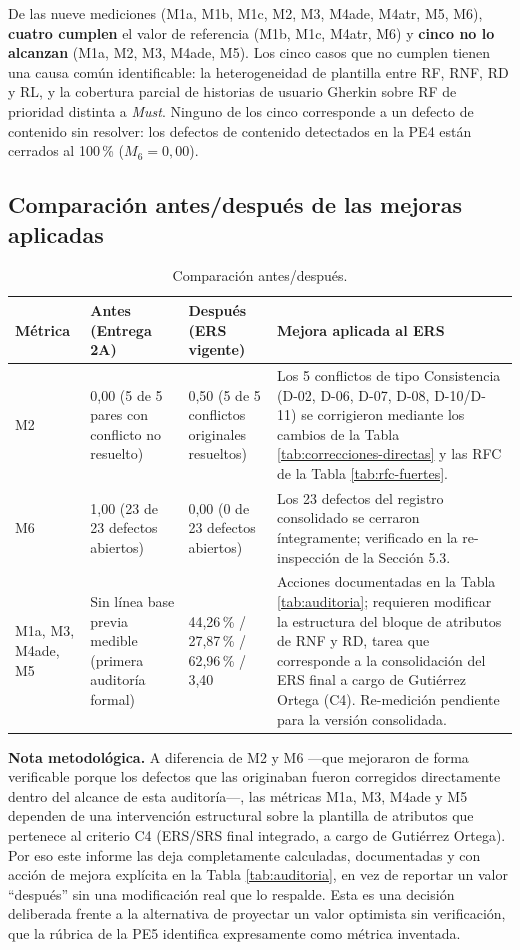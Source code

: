 \documentclass[11pt]{article}
\begin{document}
	De las nueve mediciones (M1a, M1b, M1c, M2, M3, M4ade, M4atr, M5, M6), \textbf{cuatro cumplen} el valor de referencia (M1b, M1c, M4atr, M6) y \textbf{cinco no lo alcanzan} (M1a, M2, M3, M4ade, M5). Los cinco casos que no cumplen tienen una causa común identificable: la heterogeneidad de plantilla entre RF, RNF, RD y RL, y la cobertura parcial de historias de usuario Gherkin sobre RF de prioridad distinta a \emph{Must}. Ninguno de los cinco corresponde a un defecto de contenido sin resolver: los defectos de contenido detectados en la PE4 están cerrados al 100\,\% ($M_6 = 0{,}00$).
	
	\subsection{Comparación antes/después de las mejoras aplicadas}
	
	\begin{table}[H]
		\centering
		\caption{Comparación antes/después.}
		\label{tab:antes-despues}
		\small
		\begin{tabularx}{\textwidth}{|L{2cm}|L{3.2cm}|L{3.2cm}|X|}
			\hline
			\textbf{Métrica} & \textbf{Antes (Entrega 2A)} & \textbf{Después (ERS vigente)} & \textbf{Mejora aplicada al ERS} \\
			\hline
			M2 & 0,00 (5 de 5 pares con conflicto no resuelto) & 0,50 (5 de 5 conflictos originales resueltos) & Los 5 conflictos de tipo Consistencia (D-02, D-06, D-07, D-08, D-10/D-11) se corrigieron mediante los cambios de la Tabla \ref{tab:correcciones-directas} y las RFC de la Tabla \ref{tab:rfc-fuertes}. \\
			\hline
			M6 & 1,00 (23 de 23 defectos abiertos) & 0,00 (0 de 23 defectos abiertos) & Los 23 defectos del registro consolidado se cerraron íntegramente; verificado en la re-inspección de la Sección 5.3. \\
			\hline
			M1a, M3, M4ade, M5 & Sin línea base previa medible (primera auditoría formal) & 44,26\,\% / 27,87\,\% / 62,96\,\% / 3,40 & Acciones documentadas en la Tabla \ref{tab:auditoria}; requieren modificar la estructura del bloque de atributos de RNF y RD, tarea que corresponde a la consolidación del ERS final a cargo de Gutiérrez Ortega (C4). Re-medición pendiente para la versión consolidada. \\
			\hline
		\end{tabularx}
	\end{table}
	
	\textbf{Nota metodológica.} A diferencia de M2 y M6 ---que mejoraron de forma verificable porque los defectos que las originaban fueron corregidos directamente dentro del alcance de esta auditoría---, las métricas M1a, M3, M4ade y M5 dependen de una intervención estructural sobre la plantilla de atributos que pertenece al criterio C4 (ERS/SRS final integrado, a cargo de Gutiérrez Ortega). Por eso este informe las deja completamente calculadas, documentadas y con acción de mejora explícita en la Tabla \ref{tab:auditoria}, en vez de reportar un valor ``después'' sin una modificación real que lo respalde. Esta es una decisión deliberada frente a la alternativa de proyectar un valor optimista sin verificación, que la rúbrica de la PE5 identifica expresamente como métrica inventada.
	
\end{document}
